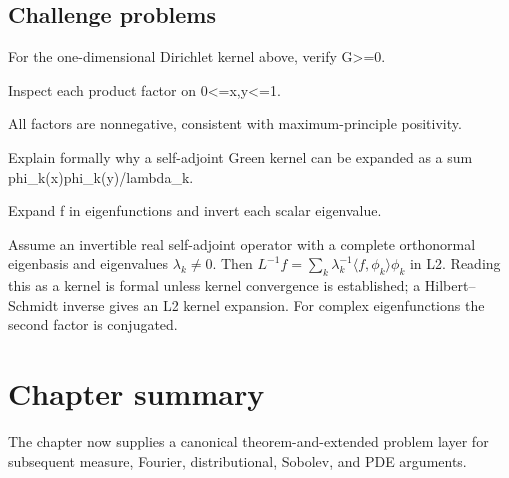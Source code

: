\subsection*{Challenge problems}

\begin{exercise}[Positivity]\label{exr:iii25-expand-15}
For the one-dimensional Dirichlet kernel above, verify G>=0.
\end{exercise}
\begin{hint}
Inspect each product factor on 0<=x,y<=1.
\end{hint}
\begin{solution}
All factors are nonnegative, consistent with maximum-principle positivity.
\end{solution}

\begin{exercise}\label{exr:iii25-expand-16}
Explain formally why a self-adjoint Green kernel can be expanded as a sum phi\_k(x)phi\_k(y)/lambda\_k.
\end{exercise}
\begin{hint}
Expand f in eigenfunctions and invert each scalar eigenvalue.
\end{hint}
\begin{solution}
Assume an invertible real self-adjoint operator with a complete orthonormal eigenbasis and eigenvalues $\lambda_k\ne0$. Then $L^{-1}f=\sum_k\lambda_k^{-1}\langle f,\phi_k\rangle\phi_k$ in L2. Reading this as a kernel is formal unless kernel convergence is established; a Hilbert--Schmidt inverse gives an L2 kernel expansion. For complex eigenfunctions the second factor is conjugated.
\end{solution}
\section*{Chapter summary}
The chapter now supplies a canonical theorem-and-extended problem layer for subsequent measure, Fourier, distributional, Sobolev, and PDE arguments.
